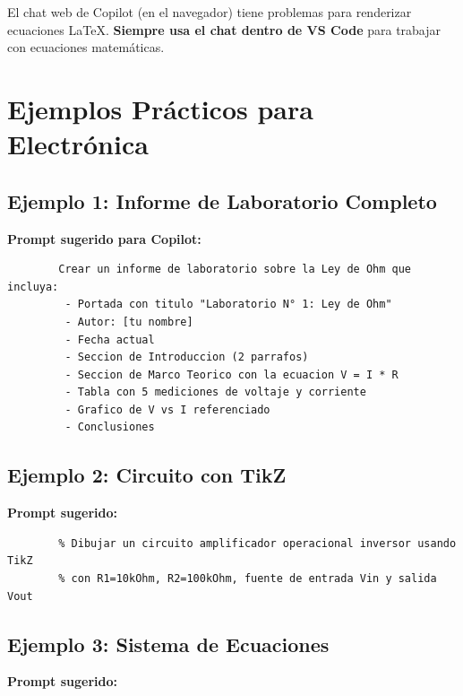 \documentclass[11pt,a4paper]{article}
\begin{document}
\begin{advertencia}
	El chat web de Copilot (en el navegador) tiene problemas para renderizar ecuaciones LaTeX. \textbf{Siempre usa el chat dentro de VS Code} para trabajar con ecuaciones matemáticas.
\end{advertencia}
	
	\newpage
	
	
	\section{Ejemplos Prácticos para Electrónica}
	
	\subsection{Ejemplo 1: Informe de Laboratorio Completo}
	
	\textbf{Prompt sugerido para Copilot:}
	
	\begin{lstlisting}
		Crear un informe de laboratorio sobre la Ley de Ohm que incluya:
		 - Portada con titulo "Laboratorio N° 1: Ley de Ohm"
		 - Autor: [tu nombre]
		 - Fecha actual
		 - Seccion de Introduccion (2 parrafos)
		 - Seccion de Marco Teorico con la ecuacion V = I * R
		 - Tabla con 5 mediciones de voltaje y corriente
		 - Grafico de V vs I referenciado
		 - Conclusiones
	\end{lstlisting}
	
	\subsection{Ejemplo 2: Circuito con TikZ}
	
	\textbf{Prompt sugerido:}
	
	\begin{lstlisting}
		% Dibujar un circuito amplificador operacional inversor usando TikZ
		% con R1=10kOhm, R2=100kOhm, fuente de entrada Vin y salida Vout
	\end{lstlisting}
	
	\subsection{Ejemplo 3: Sistema de Ecuaciones}
	
	\textbf{Prompt sugerido:}
	
\end{document}
